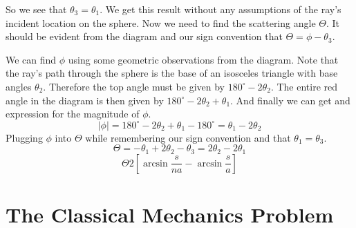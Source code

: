 \documentclass[10pt,a4paper]{article}
\begin{document}
So we see that $\theta_3 = \theta_1$.  We get this result without any assumptions of the ray's incident location on the sphere.  Now we need to find the scattering angle $\Theta$.  It should be evident from the diagram and our sign convention that $\Theta=\phi-\theta_3$.

We can find $\phi$ using some geometric observations from the diagram.  Note that the ray's path through the sphere is the base of an isosceles triangle with base angles $\theta_2$.  Therefore the top angle must be given by $180^\circ-2\theta_2$.  The entire red angle in the diagram is then given by $180^\circ-2\theta_2+\theta_1$. And finally we can get and expression for the magnitude of $\phi$.
\begin{equation}
|\phi|=180^\circ-2\theta_2+\theta_1-180^\circ=\theta_1-2\theta_2
\end{equation}
Plugging $\phi$ into $\Theta$ while remembering our sign convention and that $\theta_1=\theta_3$.
\begin{equation}
\Theta=-\theta_1+2\theta_2-\theta_3=2\theta_2-2\theta_1
\end{equation}
\begin{equation}
\Theta 2\left[\arcsin \frac{s}{na}-\arcsin\frac{s}{a}\right]
\end{equation}

\section{The Classical Mechanics Problem}
\end{document}
